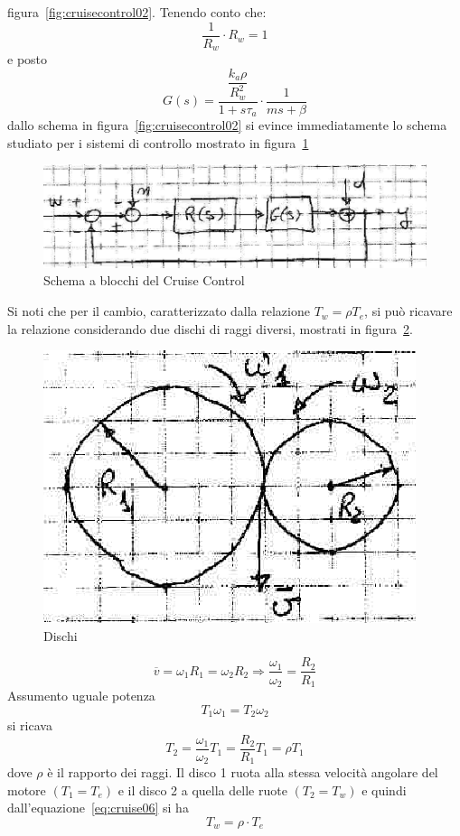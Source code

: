 \documentclass[a4paper]{report}
\begin{document}
figura~\ref{fig:cruisecontrol02}. Tenendo conto che:
\[
\dfrac{1}{R_w} \cdot R_w = 1
\]
e posto
\begin{equation}\label{eq:cruise05}
  G(s) = \dfrac{\dfrac{k_a \rho}{R_w^2}}{1 + s \tau_a} \cdot
  \dfrac{1}{ms + \beta}
\end{equation}
dallo schema in figura~\ref{fig:cruisecontrol02} si evince
immediatamente lo schema studiato per i sistemi di controllo mostrato
in figura~\ref{fig:cruisecontrol03}
\begin{figure}[!h]
  \begin{center}
    \includegraphics[scale=0.25]{./images/cruisecontrol03}
    \caption{Schema a blocchi del Cruise
      Control}\label{fig:cruisecontrol03}
  \end{center}
\end{figure}

Si noti che per il cambio, caratterizzato dalla relazione $T_w = \rho
T_e$, si pu\`o ricavare la relazione considerando due dischi di raggi
diversi, mostrati in figura~\ref{fig:cruisecontrol04}.
\begin{figure}[!h]
  \begin{center}
    \includegraphics[scale=0.25]{./images/cruisecontrol04}
    \caption{Dischi}\label{fig:cruisecontrol04}
  \end{center}
\end{figure}
\[
\overline{v} = \omega_1 R_1 = \omega_2 R_2 \Rightarrow
\dfrac{\omega_1}{\omega_2} = \dfrac{R_2}{R_1}
\]
Assumento uguale potenza
\[
T_1 \omega_1 = T_2 \omega_2
\]
si ricava
\begin{equation}\label{eq:cruise06}
  T_2 = \dfrac{\omega_1}{\omega_2} T_1 = \dfrac{R_2}{R_1} T_1 = \rho T_1
\end{equation}
dove $\rho$ \`e il rapporto dei raggi. Il disco 1 ruota alla stessa
velocit\`a angolare del motore $(T_1 = T_e)$ e il disco 2 a quella delle
ruote $(T_2 = T_w)$ e quindi dall'equazione~\ref{eq:cruise06} si ha
\[
T_w = \rho \cdot T_e
\]
\end{document}
